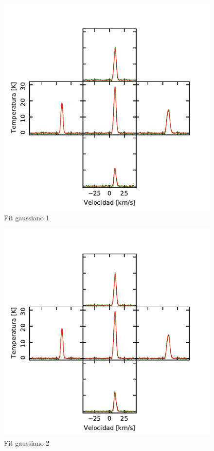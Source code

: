 \begin{figure}[htbp]
	\centering
	\includegraphics{specfit1.pdf}
	\caption{Fit gaussiano 1}
	\label{fig:specfit1}
\end{figure}

\begin{figure}[htbp]
	\centering
	\includegraphics{specfit2.pdf}
	\caption{Fit gaussiano 2}
	\label{fig:specfit2}
\end{figure}

